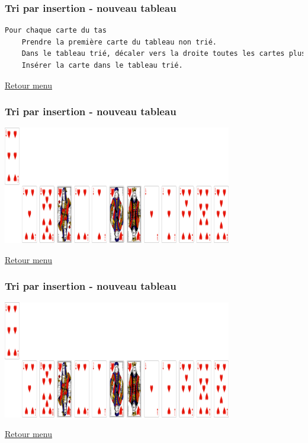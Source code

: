 \documentclass[svgnames,11pt]{beamer}
\begin{document}
\begin{frame}[fragile]
    \frametitle{\hypertarget{insertion2}{Tri par insertion - nouveau tableau}
    }
    \begin{center}
        \begin{lstlisting}[language=bash, basicstyle=\small, xrightmargin=1em]
Pour chaque carte du tas
    Prendre la première carte du tableau non trié.
    Dans le tableau trié, décaler vers la droite toutes les cartes plus grandes.
    Insérer la carte dans le tableau trié.
        \end{lstlisting}
        \label{CODE}
    \end{center}
\hyperlink{menu}{Retour menu}
\end{frame}
\begin{frame}
    \frametitle{Tri par insertion - nouveau tableau}

    \begin{center}
        \centering
        \includegraphics[width=10cm]{ressources/insertion2-1.png}
        \label{pique}
    \end{center}
    \hyperlink{menu}{Retour menu}

\end{frame}

\begin{frame}
    \frametitle{Tri par insertion - nouveau tableau}

    \begin{center}
        \centering
        \includegraphics[width=10cm]{ressources/insertion2-1.png}
        \label{pique}
    \end{center}
    \hyperlink{menu}{Retour menu}

\end{frame}
\end{document}
